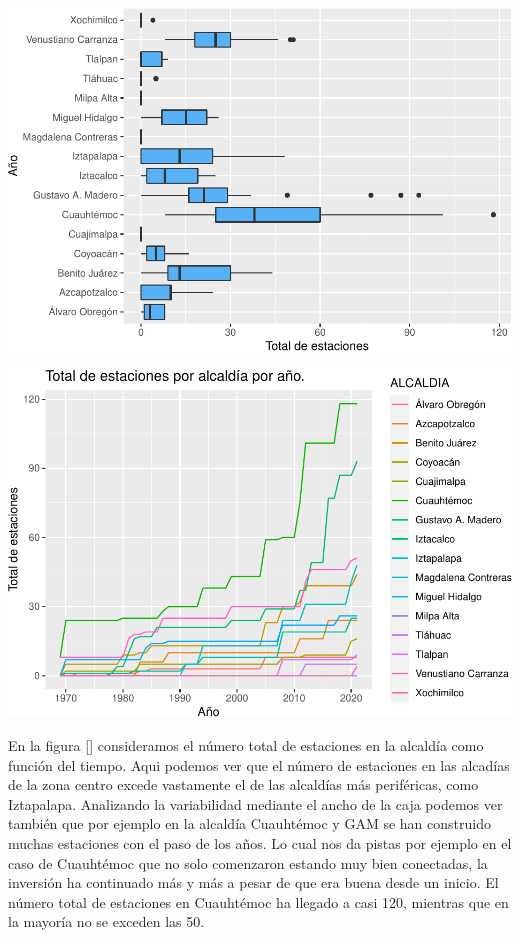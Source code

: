\documentclass[
  spanish,
]{article}
\begin{document}
\begin{center}\includegraphics{proyecto_files/figure-latex/unnamed-chunk-8-2} \end{center}

\begin{center}\includegraphics{proyecto_files/figure-latex/unnamed-chunk-9-1} \end{center}

En la figura {[}{]} consideramos el número total de estaciones en la
alcaldía como función del tiempo. Aqui podemos ver que el número de
estaciones en las alcadías de la zona centro excede vastamente el de las
alcaldías más periféricas, como Iztapalapa. Analizando la variabilidad
mediante el ancho de la caja podemos ver también que por ejemplo en la
alcaldía Cuauhtémoc y GAM se han construido muchas estaciones con el
paso de los años. Lo cual nos da pistas por ejemplo en el caso de
Cuauhtémoc que no solo comenzaron estando muy bien conectadas, la
inversión ha continuado más y más a pesar de que era buena desde un
inicio. El número total de estaciones en Cuauhtémoc ha llegado a casi
120, mientras que en la mayoría no se exceden las 50.
\end{document}
